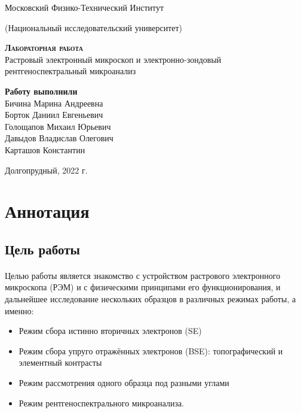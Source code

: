 \documentclass[a4paper,12pt]{article} %
\begin{document}
 
\begin{titlepage}
  \begin{center}
    \large
    Московский Физико-Технический Институт
    
    (Национальный исследовательский университет)
    \vspace{0.5cm}

   
    \vspace{0.25cm}
 
    \vfill
 
    \vfill

    \textsc{\bf{Лабораторная работа}}\\[5mm]
    
    {\LARGE Растровый электронный микроскоп и электронно-зондовый рентгеноспектральный микроанализ}
  \bigskip
    \vfill
    
\end{center}
\vfill
\begin{flushright}

    \textbf{Работу выполнили} \\
    Бичина Марина Андреевна \\
    Борток Даниил Евгеньевич \\
    Голощапов Михаил Юрьевич \\
    Давыдов Владислав Олегович \\
    Карташов Константин \\

\end{flushright}

\bigskip


\vfill

\begin{center}
  Долгопрудный, 2022 г.
\end{center}
\end{titlepage}

\section{Аннотация}

\subsection{Цель работы}

\paragraph{} Целью работы является знакомство с устройством растрового электронного микроскопа (РЭМ) и с физическими принципами его функционирования, и дальнейшее исследование нескольких образцов в различных режимах работы, а именно:
\begin{itemize}
\itemsep0em
\item Режим сбора истинно вторичных электронов (SE)
\item Режим сбора упруго отражённых электронов (BSE): топографический и элементный контрасты
\item Режим рассмотрения одного образца под разными углами
\item Режим рентгеноспектрального микроанализа.
\end{itemize}
\end{document}
